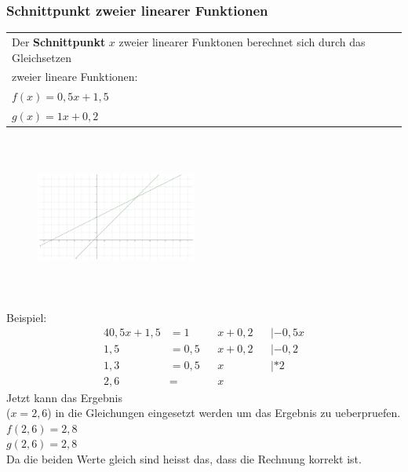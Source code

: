 \documentclass[a4paper]{article} %
\begin{document}
	\subsubsection{Schnittpunkt zweier linearer Funktionen}
		\begin{tabular}[t]{llr} 
			Der \textbf{Schnittpunkt} $x$ zweier linearer Funktonen berechnet sich durch das Gleichsetzen\\ zweier lineare Funktionen:\\
			$f(x) = 0,5x+1,5$\\
			$g(x) = 1x+0,2$
	
		\end{tabular}
		
		\begin{minipage}{0.5\textwidth}
			\begin{figure}[H]
				\includegraphics[width=200px, height=200px]{lineare2.pdf}
					\captionsetup{labelformat=empty}
				\caption{  }
			
			\end{figure}
		\end{minipage} \hfill
		\begin{minipage}{0.45\textwidth}
				Beispiel:
			\begin{alignat*}{4} 
			0,5x+1,5 &= 1 && x +0,2 && |-0,5x \\ 
			1,5 	 &= 0,5 && x+0,2 && |-0,2\\ 
			1,3 	 &= 0,5 && x &&|*2 \\
			2,6		 &=  && x  
			\end{alignat*} 
				Jetzt kann das Ergebnis\\($x=2,6$) in die Gleichungen eingesetzt werden um das Ergebnis zu ueberpruefen.\\
				$f(2,6) = 2,8$\\
				$g(2,6) = 2,8$\\
				Da die beiden Werte gleich sind heisst das, dass die Rechnung korrekt ist.
		
		
		\end{minipage}
	\newpage
\end{document}
